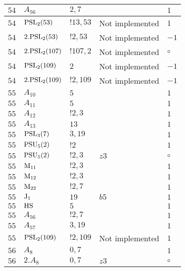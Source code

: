 \documentclass[a4paper, 11pt]{article}
\begin{document}
\begin{longtable}{lllll}
        $ 54 $ & $ A_{56} $ & $ 2, 7 $ & $ ~ $ & $ 1$ \\ \hline
        $ 54 $ & $ {\rm PSL}_{2}(53) $ & $ !13, 53 $ &  Not implemented & $ 1$ \\ \hline
        $ 54 $ & $ 2.{\rm PSL}_{2}(53) $ & $ !2, 53 $ &  Not implemented & $ -1$ \\ \hline
        $ 54 $ & $ 2.{\rm PSL}_{2}(107) $ & $ !107, 2 $ &  Not implemented &  $\circ$ \\ \hline
        $ 54 $ & $ {\rm PSL}_{2}(109) $ & $ 2 $ &  Not implemented & $ -1$ \\ \hline
        $ 54 $ & $ 2.{\rm PSL}_{2}(109) $ & $ !2, 109 $ &  Not implemented & $ -1$ \\ \hline
        $ 55 $ & $ A_{10} $ & $ 5 $ & $ ~ $ & $ 1$ \\ \hline
        $ 55 $ & $ A_{11} $ & $ 5 $ & $ ~ $ & $ 1$ \\ \hline
        $ 55 $ & $ A_{12} $ & $ ! 2,3 $ & $ ~ $ & $ 1$ \\ \hline
        $ 55 $ & $ A_{13} $ & $ 13 $ & $ ~ $ & $ 1$ \\ \hline
        $ 55 $ & $ {\rm PSL}_{3}(7) $ & $ 3,19 $ & $ ~ $ & $ 1$ \\ \hline
        $ 55 $ & $ {\rm PSU}_{5}(2) $ & $ ! 2 $ & $ ~ $ & $ 1$ \\ \hline
        $ 55 $ & $ {\rm PSU}_{5}(2) $ & $ ! 2,3 $ & $ z3 $ &  $\circ$ \\ \hline
        $ 55 $ & $ {\rm M}_{11} $ & $ ! 2,3 $ & $ ~ $ & $ 1$ \\ \hline
        $ 55 $ & $ {\rm M}_{12} $ & $ ! 2,3 $ & $ ~ $ & $ 1$ \\ \hline
        $ 55 $ & $ {\rm M}_{22} $ & $ ! 2,7 $ & $ ~ $ & $ 1$ \\ \hline
        $ 55 $ & $ {\rm J}_1 $ & $ 19 $ & $ b5 $ & $ 1$ \\ \hline
        $ 55 $ & $ {\rm HS} $ & $ 5 $ & $ ~ $ & $ 1$ \\ \hline
        $ 55 $ & $ A_{56} $ & $ !2, 7 $ & $ ~ $ & $ 1$ \\ \hline
        $ 55 $ & $ A_{57} $ & $ 3, 19 $ & $ ~ $ & $ 1$ \\ \hline
        $ 55 $ & $ {\rm PSL}_{2}(109) $ & $ !2, 109 $ &  Not implemented & $ 1$ \\ \hline
        $ 56 $ & $ A_{8} $ & $ 0,7 $ & $ ~ $ & $ 1$ \\ \hline
        $ 56 $ & $ 2.A_{8} $ & $ 0,7 $ & $ z3 $ &  $\circ$ \\ \hline

\end{longtable}
\end{document}
